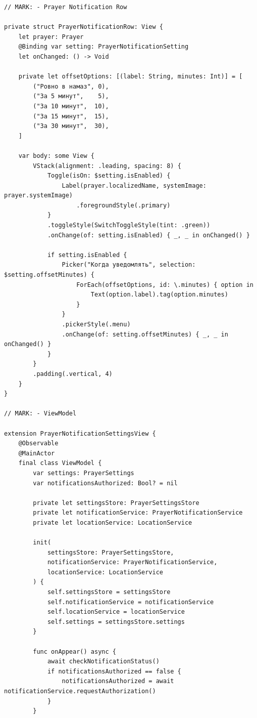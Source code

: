\begin{lstlisting}[basicstyle=\tiny\ttfamily,breaklines=true]
// MARK: - Prayer Notification Row

private struct PrayerNotificationRow: View {
    let prayer: Prayer
    @Binding var setting: PrayerNotificationSetting
    let onChanged: () -> Void

    private let offsetOptions: [(label: String, minutes: Int)] = [
        ("Ровно в намаз", 0),
        ("За 5 минут",    5),
        ("За 10 минут",  10),
        ("За 15 минут",  15),
        ("За 30 минут",  30),
    ]

    var body: some View {
        VStack(alignment: .leading, spacing: 8) {
            Toggle(isOn: $setting.isEnabled) {
                Label(prayer.localizedName, systemImage: prayer.systemImage)
                    .foregroundStyle(.primary)
            }
            .toggleStyle(SwitchToggleStyle(tint: .green))
            .onChange(of: setting.isEnabled) { _, _ in onChanged() }

            if setting.isEnabled {
                Picker("Когда уведомлять", selection: $setting.offsetMinutes) {
                    ForEach(offsetOptions, id: \.minutes) { option in
                        Text(option.label).tag(option.minutes)
                    }
                }
                .pickerStyle(.menu)
                .onChange(of: setting.offsetMinutes) { _, _ in onChanged() }
            }
        }
        .padding(.vertical, 4)
    }
}

// MARK: - ViewModel

extension PrayerNotificationSettingsView {
    @Observable
    @MainActor
    final class ViewModel {
        var settings: PrayerSettings
        var notificationsAuthorized: Bool? = nil

        private let settingsStore: PrayerSettingsStore
        private let notificationService: PrayerNotificationService
        private let locationService: LocationService

        init(
            settingsStore: PrayerSettingsStore,
            notificationService: PrayerNotificationService,
            locationService: LocationService
        ) {
            self.settingsStore = settingsStore
            self.notificationService = notificationService
            self.locationService = locationService
            self.settings = settingsStore.settings
        }

        func onAppear() async {
            await checkNotificationStatus()
            if notificationsAuthorized == false {
                notificationsAuthorized = await notificationService.requestAuthorization()
            }
        }


\end{lstlisting}
